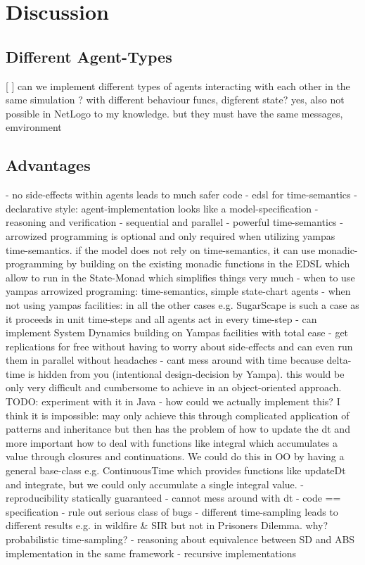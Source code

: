 \section{Discussion}

\subsection{Different Agent-Types}
[ ] can we implement different types of agents interacting with each other in the same simulation ? with different behaviour funcs, digferent state? yes, also not possible in NetLogo to my knowledge. but they must have the same messages, emvironment 

\subsection{Advantages}
	- no side-effects within agents leads to much safer code
	- edsl for time-semantics
	- declarative style: agent-implementation looks like a model-specification
	- reasoning and verification
	- sequential and parallel
	- powerful time-semantics
	- arrowized programming is optional and only required when utilizing yampas time-semantics. if the model does not rely on time-semantics, it can use monadic-programming by building on the existing monadic functions in the EDSL which allow to run in the State-Monad which simplifies things very much
	- when to use yampas arrowized programing: time-semantics, simple state-chart agents 
	- when not using yampas facilities: in all the other cases e.g. SugarScape is such a case as it proceeds in unit time-steps and all agents act in every time-step
	- can implement System Dynamics building on Yampas facilities with total ease	
	- get replications for free without having to worry about side-effects and can even run them in parallel without headaches
	- cant mess around with time because delta-time is hidden from you (intentional design-decision by Yampa). this would be only very difficult and cumbersome to achieve in an object-oriented approach. TODO: experiment with it in Java - how could we actually implement this? I think it is impossible: may only achieve this through complicated application of patterns and inheritance but then has the problem of how to update the dt and more important how to deal with functions like integral which accumulates a value through closures and continuations. We could do this in OO by having a general base-class e.g. ContinuousTime which provides functions like updateDt and integrate, but we could only accumulate a single integral value.
	- reproducibility statically guaranteed
	- cannot mess around with dt
	- code == specification
	- rule out serious class of bugs
	- different time-sampling leads to different results e.g. in wildfire \& SIR but not in Prisoners Dilemma. why? probabilistic time-sampling?
	- reasoning about equivalence between SD and ABS implementation in the same framework
	- recursive implementations
	
